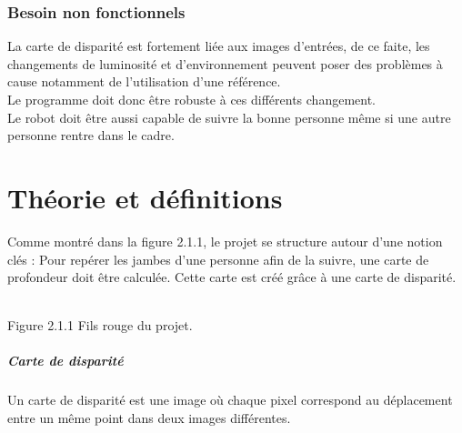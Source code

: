\documentclass[12pt,a4paper]{report}
\begin{document}
\subsection{Besoin non fonctionnels}
	La carte de disparité est fortement liée aux images d'entrées, de ce faite, les changements de luminosité et d'environnement peuvent poser des problèmes à cause notamment de l'utilisation d'une référence.\\
	Le programme doit donc être robuste à ces différents changement.\\
	Le robot doit être aussi capable de suivre la bonne personne même si une autre personne rentre dans le cadre.
	
\chapter{Théorie et définitions}

Comme montré dans la figure 2.1.1, le projet se structure autour d'une notion clés : Pour repérer les jambes d'une personne afin de la suivre, une carte de profondeur doit être calculée. Cette carte est créé grâce à une carte de disparité. 

\begin{center}
\\
Figure 2.1.1 Fils rouge du projet.
\end{center}

\paragraph{Carte de disparité}
Un carte de disparité est une image où chaque pixel correspond au déplacement entre un même point dans deux images différentes. 
\end{document}

